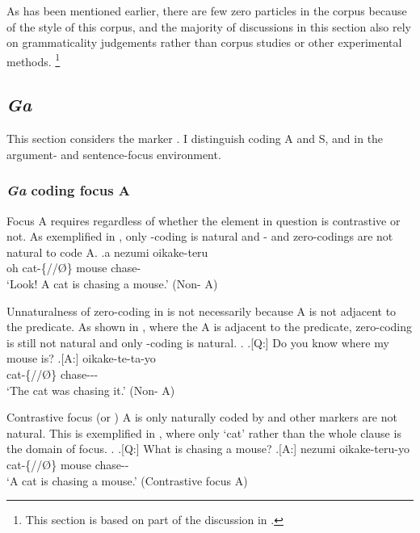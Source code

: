 As has been mentioned earlier,
there are few zero particles in the corpus because of the style of this corpus, and the majority of discussions in this section also rely on grammaticality judgements rather than corpus studies or other experimental methods.%
 \footnote{
 This section is based on part of the discussion in .
 }

\subsection{\textit{Ga}}\label{Par:CasePar:Ga}

This section considers the marker .
I distinguish  coding A and S, and  in the argument- and sentence-focus environment.

\subsubsection{\textit{Ga} coding focus A}

Focus A requires  regardless of
whether the element in question is contrastive or not.
As exemplified in \Next,
only -coding is natural and - and zero-codings are not natural
to code  A.
%
\exg.\label{ExfocusA}a  nezumi oikake-teru \\
	oh cat-\{//{\O}\} mouse chase- \\
	`Look! A cat is chasing a mouse.' \hfill{(Non- A)}

Unnaturalness of zero-coding in \Last is not necessarily because
A is not adjacent to the predicate.
As shown in \Next,
where the A is adjacent to the predicate,
zero-coding is still not natural
and only -coding is natural.
%
\ex. \a.[Q:] Do you know where my mouse is?
	\bg.[A:]  oikake-te-ta-yo \\
		cat-\{//{\O}\} chase--- \\
		`The cat was chasing it.' \hfill{(Non- A)}

Contrastive focus (or ) A is only naturally coded by 
and other markers are not natural.
This is exemplified in \Next,
where only  `cat' rather than the whole clause is the domain of focus.
%
\ex.
	\a.[Q:] What is chasing a mouse?
	\bg.[A:]  nezumi oikake-teru-yo \\
	cat-\{//{\O}\} mouse chase-- \\
	`A cat is chasing a mouse.' \hfill{(Contrastive focus A)}

